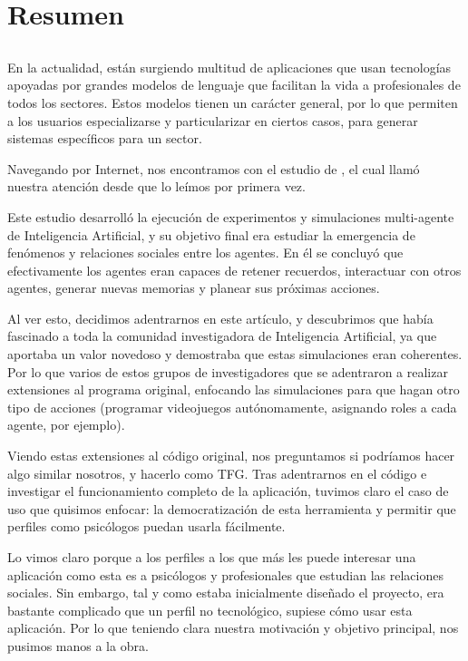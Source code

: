 \chapter*{Resumen}

\section*{\tituloPortadaVal}

En la actualidad, están surgiendo multitud de aplicaciones que usan tecnologías apoyadas por grandes modelos de lenguaje que facilitan la vida a profesionales de todos los sectores. Estos modelos tienen un carácter general, por lo que permiten a los usuarios especializarse y particularizar en ciertos casos, para generar sistemas específicos para un sector.

Navegando por Internet, nos encontramos con el estudio de \ga  \citep{park2023generative}, el cual llamó nuestra atención desde que lo leímos por primera vez.

Este estudio desarrolló la ejecución de experimentos y simulaciones multi-agente de Inteligencia Artificial, y su objetivo final era estudiar la emergencia de fenómenos y relaciones sociales entre los agentes. En él se concluyó que efectivamente los agentes eran capaces de retener recuerdos, interactuar con otros agentes, generar nuevas memorias y planear sus próximas acciones.

Al ver esto, decidimos adentrarnos en este artículo, y descubrimos que había fascinado a toda la comunidad investigadora de Inteligencia Artificial, ya que aportaba un valor novedoso y demostraba que estas simulaciones eran coherentes. Por lo que varios de estos grupos de investigadores que se adentraron a realizar extensiones al programa original, enfocando las simulaciones para que hagan otro tipo de acciones (programar videojuegos autónomamente, asignando roles a cada agente, por ejemplo).

Viendo estas extensiones al código original, nos preguntamos si podríamos hacer algo similar nosotros, y hacerlo como TFG. Tras adentrarnos en el código e investigar el funcionamiento completo de la aplicación, tuvimos claro el caso de uso que quisimos enfocar: la democratización de esta herramienta y permitir que perfiles como psicólogos puedan usarla fácilmente.

Lo vimos claro porque a los perfiles a los que más les puede interesar una aplicación como esta es a psicólogos y profesionales que estudian las relaciones sociales. Sin embargo, tal y como estaba inicialmente diseñado el proyecto, era bastante complicado que un perfil no tecnológico, supiese cómo usar esta aplicación. Por lo que teniendo clara nuestra motivación y objetivo principal, nos pusimos manos a la obra.\\[0.1em]

